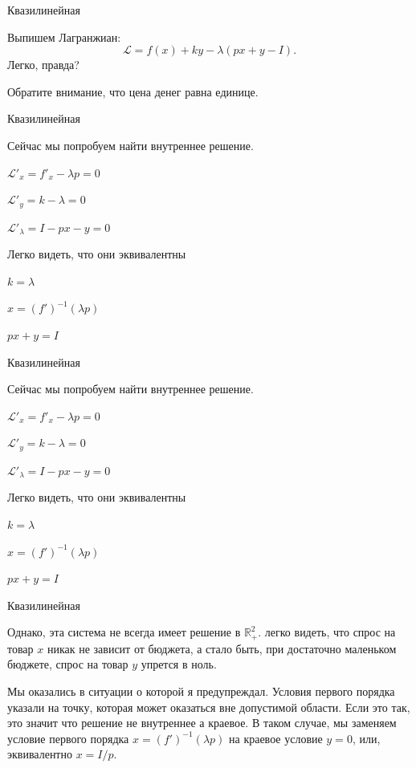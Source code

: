 \documentclass{beamer}
\begin{document}
\begin{frame}{Квазилинейная}

Выпишем Лагранжиан:
$$\mathcal{L} = f(x) + k y - \lambda (px + y - I).$$ 
Легко, правда?

Обратите внимание, что цена денег равна единице.

\end{frame}

\begin{frame}{Квазилинейная}

Сейчас мы попробуем найти внутреннее решение.

$\mathcal{L}'_x = f'_x - \lambda p = 0$

$\mathcal{L}'_y = k - \lambda = 0$

$\mathcal{L}'_{\lambda} = I - p x - y= 0$

Легко видеть, что они эквивалентны

$k = \lambda$

$x = (f')^{-1}(\lambda p)$

$px + y = I$

\end{frame}

\begin{frame}{Квазилинейная}

Сейчас мы попробуем найти внутреннее решение.

$\mathcal{L}'_x = f'_x - \lambda p = 0$

$\mathcal{L}'_y = k - \lambda = 0$

$\mathcal{L}'_{\lambda} = I - p x - y= 0$

Легко видеть, что они эквивалентны

$k = \lambda$

$x = (f')^{-1}(\lambda p)$

$px + y = I$

\end{frame}

\begin{frame}{Квазилинейная}

Однако, эта система не всегда имеет решение в $\mathbb{R}^2_{+}$. легко видеть, что спрос на товар $x$ никак не зависит от бюджета, а стало быть, при достаточно маленьком бюджете, спрос на товар $y$ упрется в ноль.

Мы оказались в ситуации о которой я предупреждал. Условия первого порядка указали на точку, которая может оказаться вне допустимой области. Если это так, это значит что решение  не внутреннее а краевое. В таком случае, мы заменяем условие первого порядка  $x = (f')^{-1}(\lambda p)$ на краевое условие $y=0$, или, эквивалентно $x = I/p$.

\end{frame}
\end{document}
